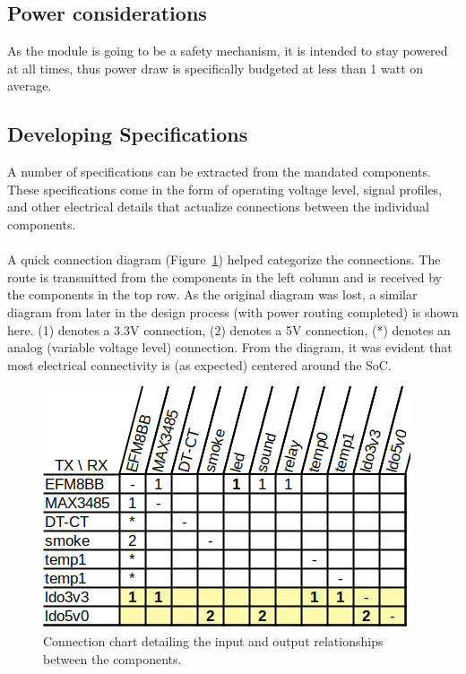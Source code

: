 \documentclass[12pt]{article}
\begin{document}
  \subsection{Power considerations}
  As the module is going to be a safety mechanism, it is intended to stay powered at all times, thus power draw is specifically budgeted at less than 1 watt on average.
	
  \subsection{Developing Specifications}
  A number of specifications can be extracted from the mandated components. These specifications come in the form of operating voltage level, signal profiles, and other electrical details that actualize connections between the individual components.


  \paragraph{}
  A quick connection diagram (Figure~\ref{fig:connect-diag}) helped categorize the connections. The route is transmitted from the components in the left column and is received by the components in the top row. As the original diagram was lost, a similar diagram from later in the design process (with power routing completed) is shown here. (1) denotes a 3.3V connection, (2) denotes a 5V connection, (*) denotes an analog (variable voltage level) connection. From the diagram, it was evident that most electrical connectivity is (as expected) centered around the SoC. 
  
  \begin{figure}[]
    \centering
    \caption{Connection chart detailing the input and output relationships between the components.}
    \label{fig:connect-diag}
    \includegraphics{connection-chart}
  \end{figure}
	
\end{document}
